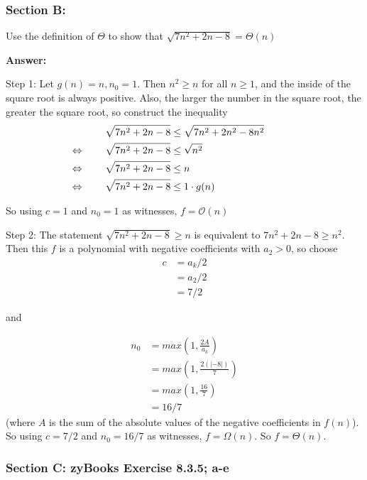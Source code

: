 \documentclass[14pt]{extreport}
\newcommand{\eq}[0]{\llap{\( \Leftrightarrow \) \qquad}}
\newcommand{\answer}[0]{\medskip \textbf{Answer:} \medskip}
\newcommand{\Bigo}[0]{\mathcal{O}}
\begin{document}
\subsubsection*{Section B:}

Use the definition of \( \Theta \) to show that \( \sqrt{7n^2 + 2n - 8} = \Theta(n) \)
        
    \answer

    Step 1: Let \( g(n) = n, n_0 = 1 \). Then \( n^2 \geq n \) for all \( n \geq 1 \), and the inside of the square root is always positive. Also, the larger the number in the square root, the greater the square root, so construct the inequality
    \begin{align*}
        & \sqrt{7n^2 + 2n - 8} \leq \sqrt{7n^2 + 2n^2 - 8n^2} \\
        &\eq \sqrt{7n^2 + 2n - 8} \leq \sqrt{n^2} \\
        &\eq \sqrt{7n^2 + 2n - 8} \leq n \\
        &\eq \sqrt{7n^2 + 2n - 8} \leq 1 \cdot g(n)
    \end{align*}

    So using \( c = 1 \) and \( n_0 = 1 \) as witnesses, \( f = \Bigo(n) \)

    \medskip

    Step 2: The statement \( \sqrt{7n^2 + 2n - 8} \geq n \) is equivalent to \( 7n^2 + 2n - 8 \geq n^2 \). Then this \( f \) is a polynomial with negative coefficients with \( a_2 > 0 \), so choose
    \begin{align*}
        c &= a_k / 2 \\
          &= a_2 / 2 \\
          &= 7 / 2
    \end{align*}

    and 

    \begin{align*}
        n_0 &= max(1, \frac{2A}{a_k}) \\
            &= max(1, \frac{2(|-8|)}{7}) \\
            &= max(1, \frac{16}{7}) \\
            &= 16 / 7
    \end{align*}
    (where \( A \) is the sum of the absolute values of the negative coefficients in \( f(n) \)). So using \( c = 7 / 2 \) and \( n_0 = 16 / 7 \) as witnesses, \( f = \Omega(n) \). So \( f = \Theta(n) \).

\subsubsection*{Section C: zyBooks Exercise 8.3.5; a-e}
\end{document}
